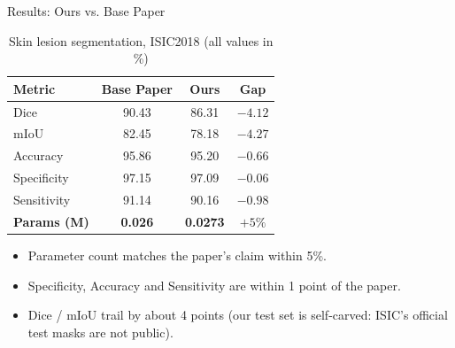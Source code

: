 \documentclass[11pt]{beamer}
\begin{document}
\begin{frame}{Results: Ours vs. Base Paper}
    \begin{table}
        \centering
        \small
        \begin{tabular}{l|c|c|c}
            \hline
            \textbf{Metric} & \textbf{Base Paper} & \textbf{Ours} & \textbf{Gap} \\ \hline
            Dice        & 90.43  & 86.31 & $-4.12$ \\ \hline
            mIoU        & 82.45  & 78.18 & $-4.27$ \\ \hline
            Accuracy    & 95.86  & 95.20 & $-0.66$ \\ \hline
            Specificity & 97.15  & 97.09 & $-0.06$ \\ \hline
            Sensitivity & 91.14  & 90.16 & $-0.98$ \\ \hline
            \textbf{Params (M)} & \textbf{0.026} & \textbf{0.0273} & $+5\%$ \\ \hline
        \end{tabular}
        \caption{Skin lesion segmentation, ISIC2018 (all values in \%)}
    \end{table}

    \begin{itemize}
        \item Parameter count matches the paper's claim within 5\%.
        \item Specificity, Accuracy and Sensitivity are within 1 point of the paper.
        \item Dice / mIoU trail by about 4 points (our test set is self-carved:
              ISIC's official test masks are not public).
    \end{itemize}
\end{frame}
\end{document}
